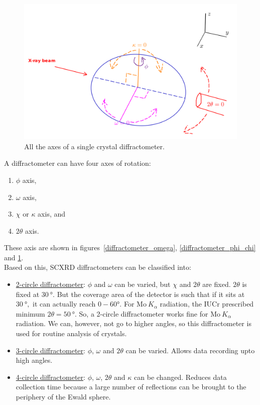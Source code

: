 \begin{figure}
	\centering
	\includegraphics[scale=0.15]{all_axes.png}
	\caption{\label{diffractometer_all_axes}All the axes of a single crystal diffractometer.}
\end{figure}
 
A diffractometer can have four axes of rotation:%
%	
	\begin{enumerate}%
%	
	    \item $\phi$ axis,
	    
	    \item $\omega$ axis,
	    
	    \item $\chi$ or $\kappa$ axis, and
	    
	    \item $2\theta$ axis.
	    
	\end{enumerate}

These axis are shown in figures~\ref{diffractometer_omega}, \ref{diffractometer_phi_chi} and \ref{diffractometer_all_axes}.\\

Based on this, SCXRD diffractometers can be classified into:%
%	
	\begin{itemize}%
%	
	    \item \ul{2-circle diffractometer}: $\phi$ and $\omega$ can be varied, but $\chi$ and $2\theta$ are fixed. $2\theta$ is fixed at $\SI{30}{\degree}.$ But the coverage area of the detector is such that if it sits at $\SI{30}{\degree},$ it can actually reach $0-60\si{\degree}.$ For $\mathrm{Mo}~K_\alpha$ radiation, the IUCr prescribed minimum $2\theta = \SI{50}{\degree}.$ So, a 2-circle diffractometer works fine for $\mathrm{Mo}~K_\alpha$ radiation. We can, however, not go to higher angles, so this diffractometer is used for routine analysis of crystals.
	    
	    \item \ul{3-circle diffractometer}: $\phi$, $\omega$ and $2\theta$ can be varied. Allows data recording upto high angles.
	    
	    \item \ul{4-circle diffractometer}: $\phi$, $\omega$, $2\theta$ and $\kappa$ can be changed. Reduces data collection time because a large number of reflections can be brought to the periphery of the Ewald sphere.
	    
	\end{itemize}
	

